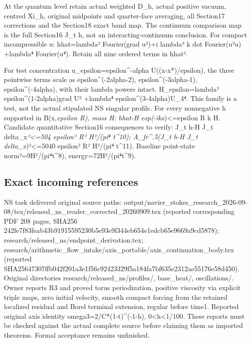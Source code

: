 At the quantum level retain actual weighted D\_h, actual positive
vacuum, centred Xi\_h, original midpoints and quarter-face averaging,
all Section17 corrections and the Section18 exact band map. The
continuum comparison map is the full Section16 J\_t h, not an
interacting-continuum conclusion. For compact incompressible u:
hhat=lambda² Fourier(\textbar grad u\textbar²)+i lambda³ k dot
Fourier(\textbar u\textbar²u) +lambda⁴ Fourier(\textbar u\textbar⁴).
Retain all nine ordered terms in \textbar hhat\textbar².

For test concentration u\_epsilon=epsilon\^{}-alpha U((x-x*)/epsilon),
the three pointwise terms scale as epsilon\^{}(-2alpha-2),
epsilon\^{}(-3alpha-1), epsilon\^{}(-4alpha), with their lambda powers
intact. H\_epsilon=lambda² epsilon\^{}(1-2alpha)\textbar\textbar grad
U\textbar\textbar² +lambda⁴
epsilon\^{}(3-4alpha)\textbar\textbar U\textbar\textbar\_4⁴. This family
is a test, not the actual stipulated NS singular profile. For every
nonnegative h supported in B(x\emph{,epsilon R), mass H: \textbar hhat-H
exp(-ikx})\textbar\textless=epsilon R \textbar k\textbar{} H. Candidate
quantitative Section16 consequences to verify: \textbar\textbar J\_t h-H
J\_t delta\_x\emph{\textbar\textbar²\textless=504 epsilon² R² H²/(pi⁴
t\^{}10); \textbar\textbar A\_fr\^{}.5(J\_t h-H J\_t
delta\_x})\textbar\textbar²\textless=5040 epsilon² R² H²/(pi⁴ t\^{}11).
Baseline point-state norm²=9H²/(pi⁴t\^{}8), energy=72H²/(pi⁴t\^{}9).

\subsection{Exact incoming references}\label{nonabelian-flow-continuity-md-exact-incoming-references}

NS task delivered original source paths:
output/navier\_stokes\_research\_2026-09-08/tex/released\_ns\_reader\_corrected\_20260909.tex
(reported corresponding PDF 208 pages, SHA256
242fe7f83feab43b91915595230b5e93e9f344eb654e1edcb65e9669a9cd5878);
research/released\_ns/endpoint\_derivation.tex;
research/arithmetic\_flow\_intake/axis\_portable/axis\_continuation\_body.tex
(reported
SHA25647307ffb042f201a3e1f56c92423329f5a184fa7bf635e2312ae55176e58d450).
Original directories research/released\_ns/profiles/, base\_heat/,
oscillations/. Owner reports R3 and proved torus periodization, positive
viscosity via explicit triple maps, zero initial velocity, smooth
compact forcing from the retained localized residual and Borel terminal
extension, regular before time1. Reported original axis identity
omega3=2/C*(1-t)\^{}(-1-h), 0\textless h\textless1/100. These reports
must be checked against the actual complete source before claiming them
as imported theorems. Formal acceptance remains unfinished.

